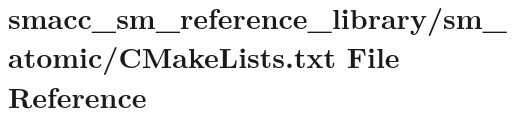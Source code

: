 \hypertarget{sm__reference__library_2sm__atomic_2CMakeLists_8txt}{}\section{smacc\+\_\+sm\+\_\+reference\+\_\+library/sm\+\_\+atomic/\+C\+Make\+Lists.txt File Reference}
\label{sm__reference__library_2sm__atomic_2CMakeLists_8txt}
